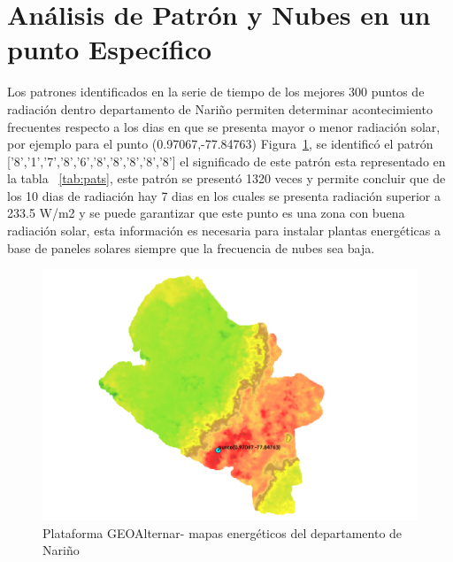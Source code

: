\section{Análisis de Patrón y Nubes en un punto Específico}
Los patrones identificados en la serie de tiempo de los mejores 300 puntos de radiación dentro departamento de Nariño permiten determinar acontecimiento 
frecuentes respecto a los dias en que se presenta mayor o menor radiación solar, por ejemplo para el punto (0.97067,-77.84763) Figura~\ref{fig:pp}, se 
identificó el patrón ['8','1','7','8','6','8','8','8','8','8'] el significado de este patrón esta representado en la tabla ~\ref{tab:pats}, este patrón 
se presentó 1320 veces y permite concluir que de los 10 dias de radiación hay 7 dias en los cuales se presenta radiación superior a 233.5 W/m2 y se puede 
garantizar que este punto es una zona con buena radiación solar, esta información es necesaria para instalar plantas energéticas a base de paneles solares 
siempre que la frecuencia de nubes sea baja.
\begin{figure}[htbp]
  \centering 
  \includegraphics[scale=0.55]{pictures/pp.png}
  \caption{ Plataforma GEOAlternar- mapas energéticos del departamento de Nariño}
  \label{fig:pp}
\end{figure}

